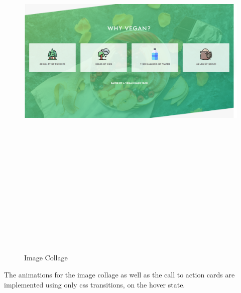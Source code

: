 \begin{figure}[!hb]
\centering
\caption[Image Collage]{Image Collage}%
\label{fig:image_collage}
\includegraphics[width=\linewidth,height=20cm,keepaspectratio]{img/image_collage}
\end{figure}

The animations for the image collage as well as the call to action cards are implemented using only css transitions, on the hover state.

